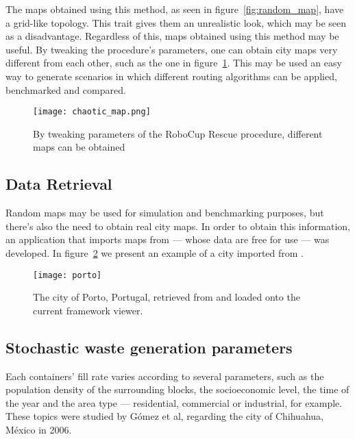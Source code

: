 The maps obtained using this method, as seen in figure~\ref{fig:random_map},
have a grid-like topology. This trait gives them an unrealistic look, which may
be seen as a disadvantage. Regardless of this, maps obtained using this method
may be useful. By tweaking the procedure's parameters, one can obtain city maps
very different from each other, such as the one in
figure~\ref{fig:chaotic_map}. This may be used an easy way to generate
scenarios in which different routing algorithms can be applied, benchmarked and
compared.

\begin{figure}[h]
\centering
\texttt{[image: chaotic\_map.png]}
\caption{By tweaking parameters of the RoboCup Rescue procedure, different maps can be obtained}
\label{fig:chaotic_map}
\end{figure}



\subsection{\osm{} Data Retrieval}
\label{section:osm}

Random maps may be used for simulation and benchmarking purposes, but there's
also the need to obtain real city maps. In order to obtain this information, an
application that imports maps from \osm{} --- whose data are free for use ---
was developed.  In figure~\ref{fig:porto} we present an example of a city
imported from \osm{}.

\begin{figure}[th]
  \begin{center}
    \leavevmode
    \texttt{[image: porto]}
    \caption{The city of Porto, Portugal, retrieved from \osm{} and loaded onto the current framework viewer.}
    \label{fig:porto}
  \end{center}
\end{figure}



\subsection{Stochastic waste generation parameters}
\label{section:parameters}

Each containers' fill rate varies according to several parameters, such as the
population density of the surrounding blocks, the socioeconomic level, the time
of the year and the area type --- residential, commercial or industrial, for
example. These topics were studied by Gómez et al, regarding the city of
Chihuahua, México in 2006\citep{Gomez20092018,Gomez20082465}.

